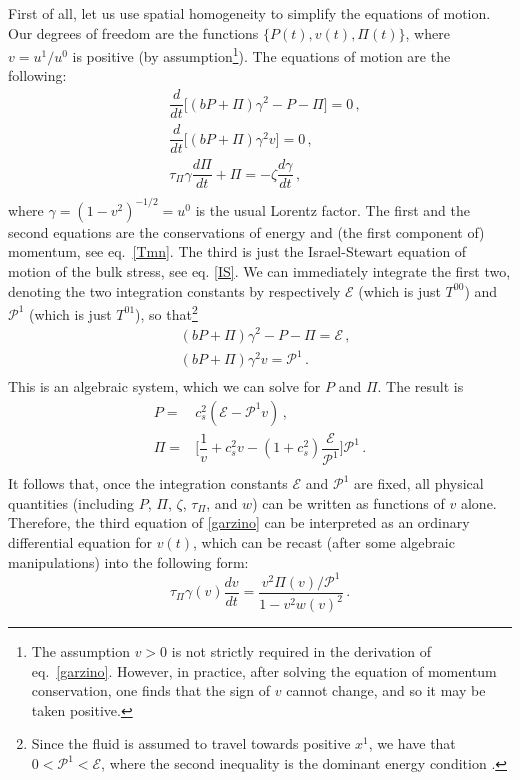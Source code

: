 \documentclass[aps, prd, showkeys,superscriptaddress, nofootinbib,floatfix]{revtex4-2}
\begin{document}
First of all, let us use spatial homogeneity to simplify the equations of motion. Our degrees of freedom are the functions $\{P(t),v(t),\Pi(t) \}$, where $v=u^1/u^0$ is positive (by assumption\footnote{The assumption  $v > 0$ is not strictly required in the derivation of eq.~\eqref{garzino}. However, 
in practice, after solving the equation of momentum conservation, one finds that the sign of $v$ cannot change, and so it may be taken positive.}). The equations of motion are the following:
\begin{equation}\label{garzino}
\begin{split}
& \dfrac{d}{dt}\big[(bP{+}\Pi)\gamma^2 -P-\Pi\big]=0 \, , \\
& \dfrac{d}{dt}\big[(bP{+}\Pi)\gamma^2 v\big]=0 \, , \\
& \tau_\Pi \gamma \dfrac{d\Pi}{dt} +\Pi=-\zeta \dfrac{d\gamma}{dt}  \, , \\
\end{split}
\end{equation}
where $\gamma=(1{-}v^2)^{-1/2}=u^0$ is the usual Lorentz factor. The first and the second equations are the conservations of energy and (the first component of) momentum, see eq.~\eqref{Tmn}. The third is just the Israel-Stewart equation of motion of the bulk stress, see eq. \eqref{IS}. We can immediately integrate the first two, denoting the two integration constants by respectively $\mathcal{E}$ (which is just $T^{00}$) and $\mathcal{P}^1$ (which is just $T^{01}$), so that\footnote{Since the fluid is assumed to travel towards positive $x^1$, we have that $0<\mathcal{P}^1<\mathcal{E}$, where the second inequality is the dominant energy condition \cite{Hawking:1973uf}.}
\begin{equation}\label{pppppp3545}
\begin{split}
& (bP{+}\Pi)\gamma^2 -P-\Pi=\mathcal{E} \, , \\
& (bP{+}\Pi)\gamma^2 v =\mathcal{P}^1 \, . \\
\end{split}
\end{equation}
This is an algebraic system, which we can solve for $P$ and $\Pi$. The result is
%
\begin{equation}\label{garzone}
 \begin{split}
P={}& c_s^2 (\mathcal{E}{-}\mathcal{P}^1 v) \, , \\
\Pi={}& \bigg[ \dfrac{1}{v}+ c_s^2 v -(1{+}c_s^2)\dfrac{\mathcal{E}}{\mathcal{P}^1} \bigg] \mathcal{P}^1  \, . \\
\end{split}
\end{equation}
%
It follows that, once the integration constants $\mathcal{E}$ and $\mathcal{P}^1$ are fixed, all physical quantities (including $P$, $\Pi$, $\zeta$, $\tau_\Pi$, and $w$) can be written as functions of $v$ alone. Therefore, the third equation of \eqref{garzino} can be interpreted as an ordinary differential equation for $v(t)$, which can be recast (after some algebraic manipulations) into the following form:
\begin{equation}\label{taugamone}
\tau_\Pi \gamma(v) \dfrac{dv}{dt} = \dfrac{v^2 \Pi(v)/\mathcal{P}^1}{1-v^2 w(v)^2} \, .
\end{equation}
\end{document}
